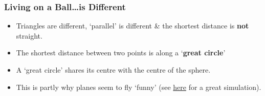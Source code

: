 \begin{frame}
\frametitle{Living on a Ball\ldots is Different}
\def\h{0.35\textheight}
%
%
\begin{itemize}
	\item Triangles are different, `parallel' is different  \& the shortest distance is \textbf{not} straight.
	\item The shortest distance between two points is along a `\textbf{great circle}'
	\item A `great circle' shares its centre with the centre of the sphere.
	\item This is partly why planes seem to fly `funny' (see \href{http://dynref.engr.illinois.edu/aos.html}{here} for a great simulation).
\end{itemize}

\bigskip

\end{frame}


